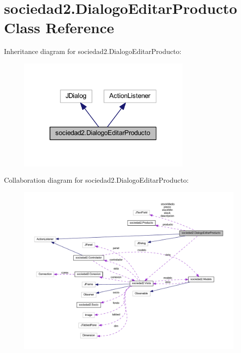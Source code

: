 \hypertarget{classsociedad2_1_1_dialogo_editar_producto}{}\section{sociedad2.\+Dialogo\+Editar\+Producto Class Reference}
\label{classsociedad2_1_1_dialogo_editar_producto}


Inheritance diagram for sociedad2.\+Dialogo\+Editar\+Producto\+:
\nopagebreak
\begin{figure}[H]
\begin{center}
\leavevmode
\includegraphics[width=241pt]{classsociedad2_1_1_dialogo_editar_producto__inherit__graph}
\end{center}
\end{figure}


Collaboration diagram for sociedad2.\+Dialogo\+Editar\+Producto\+:
\nopagebreak
\begin{figure}[H]
\begin{center}
\leavevmode
\includegraphics[width=350pt]{classsociedad2_1_1_dialogo_editar_producto__coll__graph}
\end{center}
\end{figure}
